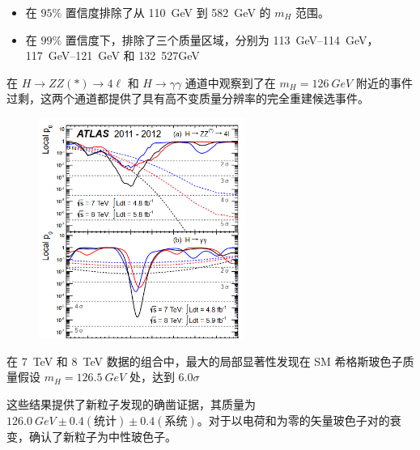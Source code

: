 \documentclass[oneside,a4paper,openany,11pt]{ctexbook}
\begin{document}
\begin{itemize}
    \item 在 $95\%$ 置信度排除了从 \qty{110}{GeV} 到 \qty{582}{GeV} 的 $m_H$ 范围。
    \item 在 $99\%$ 置信度下，排除了三个质量区域，分别为 \qtyrange{113}{114}{GeV}，\qtyrange{117}{121}{GeV} 和 \qty{132}{527}{GeV} 
\end{itemize}

在 $H\to ZZ(*)\to 4\ell$ 和 $H\to\gamma\gamma$ 通道中观察到了在 $m_H=\qty{126}{GeV}$ 附近的事件过剩，这两个通道都提供了具有高不变质量分辨率的完全重建候选事件。

\begin{figure}[htbp]
    \centering
    \includegraphics[width=0.6\textwidth]{pic/p0.png}
    \caption{}
    \label{fig:p0}
\end{figure}

在 \qty{7}{TeV} 和 \qty{8}{TeV} 数据的组合中，最大的局部显著性发现在 SM 希格斯玻色子质量假设 $m_H=\qty{126.5}{GeV}$ 处，达到 $6.0\sigma$

这些结果提供了新粒子发现的确凿证据，其质量为 $\qty{126.0}{GeV} \pm 0.4(\text{统计}) \pm 0.4(\text{系统})$。对于以电荷和为零的矢量玻色子对的衰变，确认了新粒子为中性玻色子。
\end{document}

